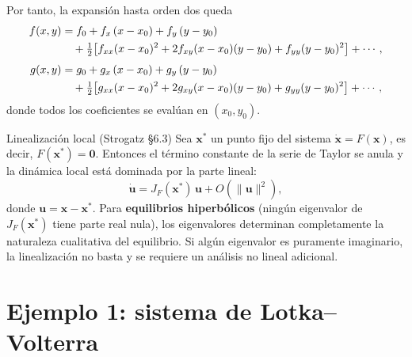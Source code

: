 \documentclass[11pt,letterpaper]{article}
\begin{document}
Por tanto, la expansión hasta orden dos queda
\begin{align}
  f(x,y) &= f_0
    + f_x\,(x-x_0) + f_y\,(y-y_0)\notag\\
    &\quad + \tfrac{1}{2}\bigl[f_{xx}(x-x_0)^2
      + 2f_{xy}(x-x_0)(y-y_0)
      + f_{yy}(y-y_0)^2\bigr] + \cdots,\label{eq:taylor_f}\\[4pt]
  g(x,y) &= g_0
    + g_x\,(x-x_0) + g_y\,(y-y_0)\notag\\
    &\quad + \tfrac{1}{2}\bigl[g_{xx}(x-x_0)^2
      + 2g_{xy}(x-x_0)(y-y_0)
      + g_{yy}(y-y_0)^2\bigr] + \cdots,\label{eq:taylor_g}
\end{align}
donde todos los coeficientes se evalúan en $(x_0,y_0)$.

\begin{teorema}{Linealización local (Strogatz \S6.3)}{}
Sea $\mathbf{x}^*$ un punto fijo del sistema $\dot{\mathbf{x}}=F(\mathbf{x})$,
es decir, $F(\mathbf{x}^*)=\mathbf{0}$. Entonces el término constante de la
serie de Taylor se anula y la dinámica local está dominada por la parte lineal:
\[
  \dot{\mathbf{u}} = J_F(\mathbf{x}^*)\,\mathbf{u} + O(\|\mathbf{u}\|^2),
\]
donde $\mathbf{u}=\mathbf{x}-\mathbf{x}^*$. Para \textbf{equilibrios hiperbólicos}
(ningún eigenvalor de $J_F(\mathbf{x}^*)$ tiene parte real nula), los eigenvalores
determinan completamente la naturaleza cualitativa del equilibrio.
Si algún eigenvalor es puramente imaginario, la linealización no basta y
se requiere un análisis no lineal adicional.
\end{teorema}


\section{Ejemplo 1: sistema de Lotka--Volterra}
\end{document}
